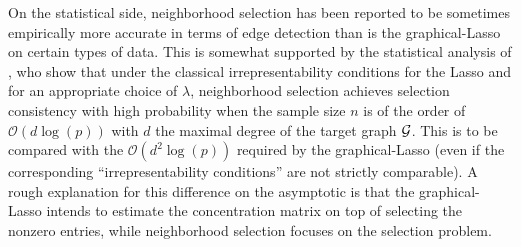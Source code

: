 On the statistical  side, neighborhood selection has  been reported to
be sometimes empirically more accurate in terms of edge detection than
is the graphical-Lasso \cite{2008_SAGM_Villers,2008_preprint_Rocha} on
certain types of data.  This  is somewhat supported by the statistical
analysis  of  \cite{2011_EJS_Ravikumar},  who   show  that  under  the
classical    irrepresentability     conditions    for     the    Lasso
\cite{2006_JMLR_Zhao,2006_AS_Meinshausen}   and  for   an  appropriate
choice  of   $\lambda$,  neighborhood  selection   achieves  selection
consistency with high  probability when the sample size $n$  is of the
order of  $\mathcal{O}(d\log(p))$ with $d$  the maximal degree  of the
target   graph  $\mathcal{G}$.    This   is  to   be   compared  with   the
$\mathcal{O}(d^2\log(p))$ required by the graphical-Lasso (even if the
corresponding  ``irrepresentability  conditions''   are  not  strictly
comparable).   A   rough  explanation  for  this   difference  on  the
asymptotic  is  that  the  graphical-Lasso  intends  to  estimate  the
concentration matrix  on top of  selecting the nonzero  entries, while
neighborhood selection focuses on the selection problem.


